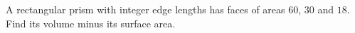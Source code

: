 A rectangular prism with integer edge lengths has faces of areas $60$, $30$ and $18$. Find its volume minus its surface area.
